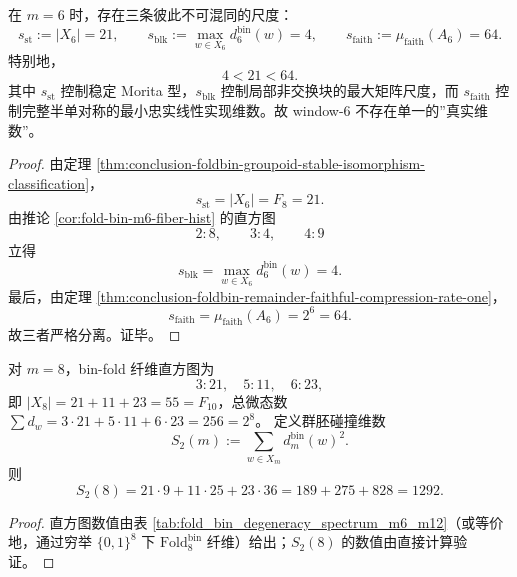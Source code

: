 \begin{corollary}\label{cor:conclusion-window6-three-rigidity-scales}
在 \(m=6\) 时，存在三条彼此不可混同的尺度：
\[
s_{\mathrm{st}}:=|X_6|=21,
\qquad
s_{\mathrm{blk}}:=\max_{w\in X_6}d_6^{\mathrm{bin}}(w)=4,
\qquad
s_{\mathrm{faith}}:=\mu_{\mathrm{faith}}(A_6)=64.
\]
特别地，
\[
4<21<64.
\]
其中 \(s_{\mathrm{st}}\) 控制稳定 Morita 型，\(s_{\mathrm{blk}}\) 控制局部非交换块的最大矩阵尺度，而 \(s_{\mathrm{faith}}\) 控制完整半单对称的最小忠实线性实现维数。故 window-\(6\) 不存在单一的”真实维数”。
\end{corollary}
\begin{proof}
由定理 \ref{thm:conclusion-foldbin-groupoid-stable-isomorphism-classification}，
\[
s_{\mathrm{st}}=|X_6|=F_8=21.
\]
由推论 \ref{cor:fold-bin-m6-fiber-hist} 的直方图
\[
2:8,\qquad 3:4,\qquad 4:9
\]
立得
\[
s_{\mathrm{blk}}=\max_{w\in X_6}d_6^{\mathrm{bin}}(w)=4.
\]
最后，由定理 \ref{thm:conclusion-foldbin-remainder-faithful-compression-rate-one}，
\[
s_{\mathrm{faith}}=\mu_{\mathrm{faith}}(A_6)=2^6=64.
\]
故三者严格分离。证毕。
\end{proof}

\begin{corollary}\label{thm:conclusion-window8-groupoid-collision-dimension-identity}
对 \(m=8\)，bin-fold 纤维直方图为
\[
3:21,\quad 5:11,\quad 6:23,
\]
即 \(|X_8|=21+11+23=55=F_{10}\)，总微态数 \(\sum d_w = 3\cdot 21+5\cdot 11+6\cdot 23=256=2^8\)。
定义群胚碰撞维数
\[
S_2(m):=\sum_{w\in X_m} d_m^{\mathrm{bin}}(w)^2.
\]
则
\[
S_2(8) = 21\cdot 9 + 11\cdot 25 + 23\cdot 36 = 189+275+828 = 1292.
\]
\end{corollary}
\begin{proof}
直方图数值由表 \ref{tab:fold_bin_degeneracy_spectrum_m6_m12}（或等价地，通过穷举 \(\{0,1\}^8\) 下 \(\mathrm{Fold}_8^{\mathrm{bin}}\) 纤维）给出；$S_2(8)$ 的数值由直接计算验证。
\end{proof}

